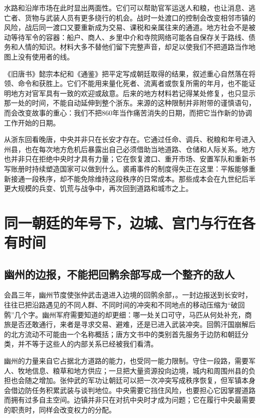水路和沿岸市场在此时显出两面性。它们可以帮助官军运送人和粮，也让消息、逃亡者、货物与武装人员有更多绕行的机会。战时一处渡口的控制会改变相邻市镇的风险，战后同一渡口又要重新成为交易、课税和亲属往来的通道。地方社会不是被动等待军令的容器：船户、商人、乡里中介和寺院网络可能各自保存关于路线、债务和人情的知识。材料大多不替他们留下完整声音，却足以使我们不把道路当作地图上没有使用者的线。

《旧唐书》懿宗本纪和《通鉴》把平定写成朝廷取得的结果，叙述重心自然落在将领、命令和获胜上。它们不能用来量化死者、流离者或恢复所需的年月，也不能证明地方对官军具有一致的欢迎或敌意。后来的地方材料若记得某处修复，也只显示那一处的时间，不能自动延伸到整个浙东。来源的这种限制并非附带的谨慎语句，而会改变故事的重心：我们不把860年当作痛苦消失的日期，而把它当作新的协调工作开始的日期。

从浙东回看晚唐，中央并非只在长安才存在。它通过任命、调兵、税粮和年号进入州县，也在每次地方危机后暴露出自己必须借助当地道路、仓储和人际关系。地方也并非只在拒绝中央时才具有力量；它在恢复渡口、重开市场、安置军队和重新书写账册时持续塑造国家可以做到什么。裘甫事件的制度得失正在这里：平叛能够重新接通一段秩序，却不能免除维持这段秩序的日常成本。那些成本会在九世纪后半更大规模的兵变、饥荒与战争中，再次回到道路和城市之上。

\section{同一朝廷的年号下，边城、宫门与行在各有时间}

\subsection{幽州的边报，不能把回鹘余部写成一个整齐的敌人}
会昌三年，幽州节度使张仲武击退进入边境的回鹘余部，。一封边报送到长安时，往往已把沿路遇见的不同人群、不同时间的冲突和不同地点的移动压缩为“破回鹘”几个字。幽州军府需要知道的却更细：哪一处关口可守，马匹从何处补充，商旅是否还敢通行，来者是寻求交易、避难，还是已进入武装冲突。回鹘汗国崩解后的北方流动不可能由一个名称概括；唐方文书中的类别首先服务于边防和朝廷分类，并不等于这些人的内部关系已经被我们看清。

幽州的力量来自它占据北方道路的能力，也受同一能力限制。守住一段路，需要军人、牧地信息、粮草和地方供应；一旦把大量资源投向边境，城内和周围州县的负担也会随之增加。张仲武的军功让朝廷可以把一次冲突写成秩序恢复，但军镇本身会借边防任务积累武装与谈判地位。中央需要它挡住风险，也要担心它因掌握道路而拥有过多自主空间。边镇并非只在对抗中央时才成为问题；它在履行中央最需要的职责时，同样会改变权力的分配。

